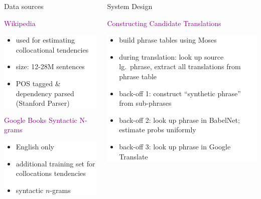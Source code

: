 \documentclass[final,t]{beamer}
\begin{document}
\begin{frame}{}
\begin{columns}[t]
\begin{column}{.4\linewidth}
\begin{block}{Data sources}
\begin{center}
\textcolor{purple}{Wikipedia}
\end{center}

\colorbox{white}{
\begin{minipage}{.85\linewidth}
\begin{itemize}
\item used for estimating collocational tendencies
\item size: 12-28M sentences
\item POS tagged \& dependency parsed (Stanford Parser)
\end{itemize}
\end{minipage}
}

\begin{center}
\textcolor{purple}{Google Books Syntactic N-grams}
\end{center}

\colorbox{white}{
\begin{minipage}{.85\linewidth}
\begin{itemize}
\item English only
\item additional training set for collocations tendencies
\item syntactic $n$-grams 

\end{itemize}
\end{minipage}
}

\end{block}

\end{column}

\begin{column}{.55\linewidth}


\begin{block}{System Design}

\begin{center}
  \textcolor{purple}{Constructing Candidate Translations}
 
 \colorbox{white}{
\begin{minipage}{.90\linewidth}
 \begin{itemize}
  \item build phrase tables using Moses
  \item during translation: look up source lg.\ phrase, extract all translations from phrase table
  \item back-off 1: construct ``synthetic phrase'' from sub-phrases
  \item back-off 2: look up phrase in BabelNet; estimate probs uniformly
  \item back-off 3: look up phrase in Google Translate\\
  \end{itemize}
\end{minipage}
}
\vspace{1cm}



\end{center}
\end{block}
\end{column}
\end{columns}
\end{frame}
\end{document}
